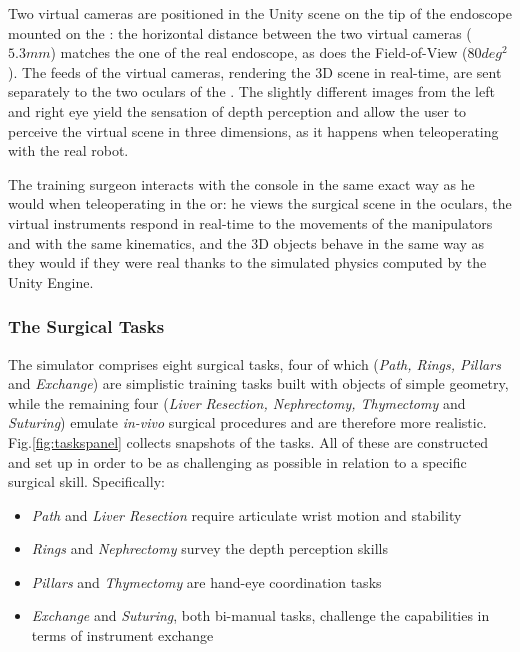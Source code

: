 \documentclass[../main.tex]{subfiles}
\begin{document}
Two virtual cameras are positioned in the Unity scene on the tip of the endoscope mounted on the \ecm: the horizontal distance between the two virtual cameras ($5.3 \unit{mm}$) matches the one of the real endoscope, as does the Field-of-View ($80 \unit{deg^2}$). The feeds of the virtual cameras, rendering the 3D scene in real-time, are sent separately to the two oculars of the \hrsv. The slightly different images from the left and right eye yield the sensation of depth perception and allow the user to perceive the virtual scene in three dimensions, as it happens when teleoperating with the real robot. 

The training surgeon interacts with the console in the same exact way as he would when teleoperating in the \ac{or}: he views the surgical scene in the oculars, the virtual instruments respond in real-time to the movements of the manipulators and with the same kinematics, and the 3D objects behave in the same way as they would if they were real thanks to the simulated physics computed by the Unity Engine.   

\subsubsection{The Surgical Tasks}
The simulator comprises eight surgical tasks, four of which (\textit{Path, Rings, Pillars} and \textit{Exchange}) are simplistic training tasks built with objects of simple geometry, while the remaining four (\textit{Liver Resection, Nephrectomy, Thymectomy} and \textit{Suturing}) emulate \textit{in-vivo} surgical procedures and are therefore more realistic. Fig.\ref{fig:taskspanel} collects snapshots of the tasks. All of these are constructed and set up in order to be as challenging as possible in relation to a specific surgical skill. Specifically:

\begin{itemize}
  \item \textit{Path} and \textit{Liver Resection} require articulate wrist motion and stability
  \item \textit{Rings} and \textit{Nephrectomy} survey the depth perception skills
  \item \textit{Pillars} and \textit{Thymectomy} are hand-eye coordination tasks
  \item \textit{Exchange} and \textit{Suturing}, both bi-manual tasks, challenge the capabilities in terms of instrument exchange 
\end{itemize}
\end{document}
